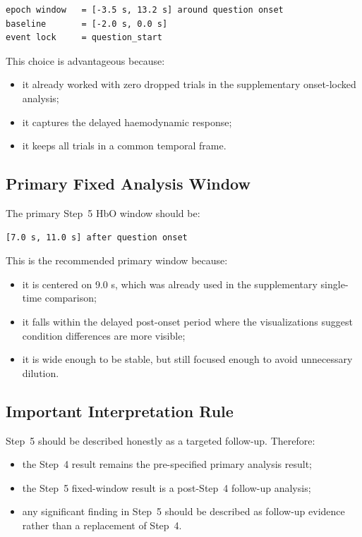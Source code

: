 \documentclass[11pt]{article}
\begin{document}
\begin{verbatim}
epoch window   = [-3.5 s, 13.2 s] around question onset
baseline       = [-2.0 s, 0.0 s]
event lock     = question_start
\end{verbatim}

This choice is advantageous because:
\begin{itemize}
    \item it already worked with zero dropped trials in the supplementary onset-locked analysis;
    \item it captures the delayed haemodynamic response;
    \item it keeps all trials in a common temporal frame.
\end{itemize}

\subsection{Primary Fixed Analysis Window}
The primary Step~5 HbO window should be:
\begin{verbatim}
[7.0 s, 11.0 s] after question onset
\end{verbatim}

This is the recommended primary window because:
\begin{itemize}
    \item it is centered on 9.0 s, which was already used in the supplementary single-time comparison;
    \item it falls within the delayed post-onset period where the visualizations suggest condition
    differences are more visible;
    \item it is wide enough to be stable, but still focused enough to avoid unnecessary dilution.
\end{itemize}

\subsection{Important Interpretation Rule}
Step~5 should be described honestly as a targeted follow-up.
Therefore:
\begin{itemize}
    \item the Step~4 result remains the pre-specified primary analysis result;
    \item the Step~5 fixed-window result is a post-Step~4 follow-up analysis;
    \item any significant finding in Step~5 should be described as follow-up evidence rather than
    a replacement of Step~4.
\end{itemize}
\end{document}
